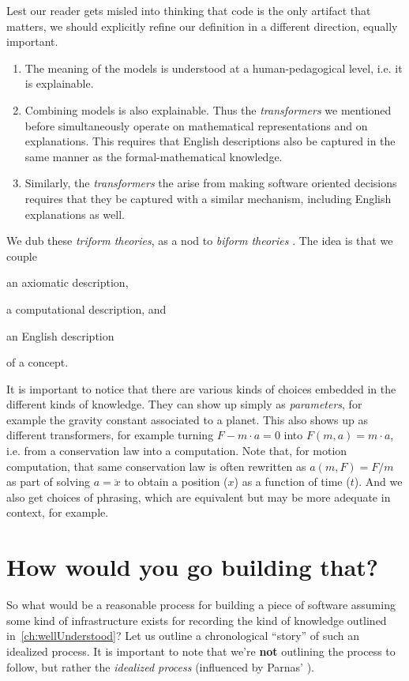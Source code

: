 \documentclass[sigconf,review]{acmart}
\begin{document}
Lest our reader gets misled into thinking that code is the only artifact
that matters, we should explicitly refine our definition in a different
direction, equally important.
\begin{enumerate}
\item The meaning of the models is understood at a human-pedagogical
level, i.e. it is explainable.
\item Combining models is also explainable. Thus the \emph{transformers}
  we mentioned before %
  simultaneously operate on mathematical representations
and on explanations. This requires that English descriptions also be
captured in the same manner as the formal-mathematical knowledge.
\item Similarly, the \emph{transformers} the arise from making software
oriented decisions requires that they be captured with a similar mechanism,
including English explanations as well.
\end{enumerate}

We dub these \emph{triform theories}, as a nod to \emph{biform theories}%
\cite{Farmer}. The idea is that we couple 
\begin{enumerate*}
\item an axiomatic description,
\item a computational description, and
\item an English description
\end{enumerate*}
of a concept.

It is important to notice that there are various kinds of choices
embedded in the different kinds of knowledge. They can show up simply as
\emph{parameters}, for example the gravity constant associated to a planet.
This also shows up as different transformers, for example turning
$F - m\cdot a = 0$ into $F\left(m, a\right) = m\cdot a$, i.e. from a 
conservation law into a computation. Note that, for motion computation, that
same conservation law is often rewritten as $a\left(m,F\right) = F/m$ as
part of solving $a = \ddot{x}$ to obtain a position ($x$) as a function of time ($t$).
And we also get choices of phrasing, which are equivalent but may be more
adequate in context, for example.

\section{How would you go building that?}\label{ch:process}

So what would be a reasonable process for building a piece of software
assuming some kind of infrastructure exists for recording the kind of
knowledge outlined in~\autoref{ch:wellUnderstood}? Let us outline a
chronological ``story'' of such an idealized process.  It is important to
note that we're \textbf{not} outlining the process to follow, but rather
the \emph{idealized process} (influenced by Parnas' \cite{Parnas1986}).
\end{document}
